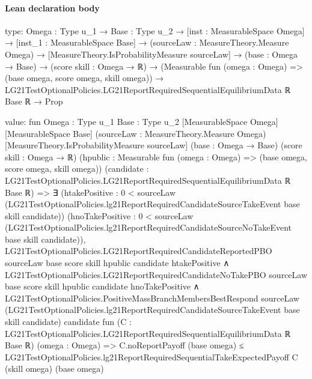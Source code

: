 \documentclass[10pt]{article}
\begin{document}
\paragraph{Lean declaration body}
\begin{ReviewVerbatim}
type:
{Omega : Type u_1} →
  {Base : Type u_2} →
    [inst : MeasurableSpace Omega] →
      [inst_1 : MeasurableSpace Base] →
        (sourceLaw : MeasureTheory.Measure Omega) →
          [MeasureTheory.IsProbabilityMeasure sourceLaw] →
            (base : Omega → Base) →
              (score skill : Omega → ℝ) →
                (Measurable fun (omega : Omega) => (base omega, score omega, skill omega)) →
                  LG21TestOptionalPolicies.LG21ReportRequiredSequentialEquilibriumData ℝ Base ℝ → Prop

value:
fun {Omega : Type u_1} {Base : Type u_2} [MeasurableSpace Omega] [MeasurableSpace Base]
    (sourceLaw : MeasureTheory.Measure Omega) [MeasureTheory.IsProbabilityMeasure sourceLaw] (base : Omega → Base)
    (score skill : Omega → ℝ) (hpublic : Measurable fun (omega : Omega) => (base omega, score omega, skill omega))
    (candidate : LG21TestOptionalPolicies.LG21ReportRequiredSequentialEquilibriumData ℝ Base ℝ) =>
  ∃ (htakePositive :
    0 < sourceLaw (LG21TestOptionalPolicies.lg21ReportRequiredCandidateSourceTakeEvent base skill candidate))
    (hnoTakePositive :
    0 < sourceLaw (LG21TestOptionalPolicies.lg21ReportRequiredCandidateSourceNoTakeEvent base skill candidate)),
    LG21TestOptionalPolicies.LG21ReportRequiredCandidateReportedPBO sourceLaw base score skill hpublic candidate
        htakePositive ∧
      LG21TestOptionalPolicies.LG21ReportRequiredCandidateNoTakePBO sourceLaw base score skill hpublic candidate
          hnoTakePositive ∧
        LG21TestOptionalPolicies.PositiveMassBranchMembersBestRespond sourceLaw
          (LG21TestOptionalPolicies.lg21ReportRequiredCandidateSourceTakeEvent base skill candidate) candidate
          fun (C : LG21TestOptionalPolicies.LG21ReportRequiredSequentialEquilibriumData ℝ Base ℝ) (omega : Omega) =>
          C.noReportPayoff (base omega) ≤
            LG21TestOptionalPolicies.lg21ReportRequiredSequentialTakeExpectedPayoff C (skill omega) (base omega)
\end{ReviewVerbatim}
\end{document}
